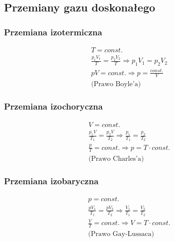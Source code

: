 \documentclass{article}
\numberwithin{equation}{section}
\begin{document}
    \subsection{Przemiany gazu doskonałego}
      \subsubsection{Przemiana izotermiczna}
        \begin{gather}
          T = const.\\
          \frac{p_1V_1}{T} = \frac{p_2V_2}{T} \Rightarrow p_1V_1 = p_2V_2\\
          pV = const. \Rightarrow p = \frac{const.}{V}\\
          \text{(Prawo Boyle'a)}
        \end{gather}
      \subsubsection{Przemiana izochoryczna}
        \begin{gather}
          V = const.\\
          \frac{p_1V}{T_1} = \frac{p_2V}{T_2} \Rightarrow \frac{p_1}{T_1} = \frac{p_2}{T_2}\\
          \frac{p}{T} = const. \Rightarrow p = T\cdot const.\\\text{(Prawo Charles'a)}
        \end{gather}
      \subsubsection{Przemiana izobaryczna}
        \begin{gather}
          p = const.\\
          \frac{pV_1}{T_1} = \frac{pV_2}{T_2} \Rightarrow \frac{V_1}{T_1} = \frac{V_2}{T_2}\\
          \frac{V}{T} = const. \Rightarrow V = T\cdot const.\\
          \text{(Prawo Gay-Lussaca)}
        \end{gather}
\end{document}
